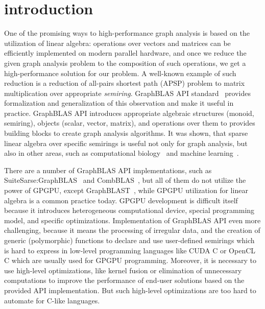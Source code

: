 \section{introduction}

One of the promising ways to high-performance graph analysis is based on the utilization of linear algebra: operations over vectors and matrices can be efficiently implemented on modern parallel hardware, and once we reduce the given graph analysis problem to the composition of such operations, we get a high-performance solution for our problem. 
A well-known example of such reduction is a reduction of all-pairs shortest path (APSP) problem to matrix multiplication over appropriate \textit{semiring}.
GraphBLAS API standard~\cite{7761646} provides formalization and generalization of this observation and make it useful in practice. 
GraphBLAS API introduces appropriate algebraic structures (monoid, semiring), objects (scalar, vector, matrix), and operations over them to provides building blocks to create graph analysis algorithms.
It was shown, that sparse linear algebra over specific semirings is useful not only for graph analysis, but also in other areas, such as computational biology~\cite{10.5555/3433701.3433800} and machine learning~\cite{8091098}.

There are a number of GraphBLAS API implementations, such as SuiteSarse:GraphBLAS~\cite{10.1145/3322125} and CombBLAS~\cite{10.1177/1094342011403516}, but all of them do not utilize the power of GPGPU, except GraphBLAST~\cite{yang2019graphblast}, while GPGPU utilization for linear algebra is a common practice today. 
GPGPU development is difficult itself because it introduces heterogeneous computational device, special programming model, and specific optimizations.
Implementation of GraphBLAS API even more challenging, because it means the processing of irregular data, and the creation of generic (polymorphic) functions to declare and use user-defined semirings which is hard to express in low-level programming languages like CUDA C or OpenCL C which are usually used for GPGPU programming.
Moreover, it is necessary to use high-level optimizations, like kernel fusion or elimination of unnecessary computations to improve the performance of end-user solutions based on the provided API implementation.
But such high-level optimizations are too hard to automate for C-like languages.

